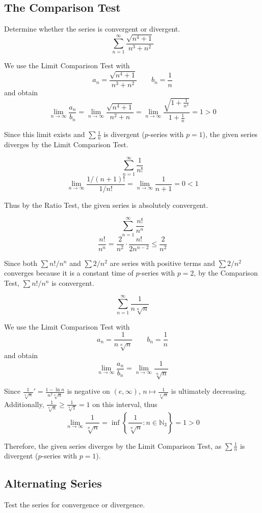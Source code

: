 \documentclass[a4paper,12pt]{article}
\begin{document}
\subsection{The Comparison Test}
Determine whether the series is convergent or divergent.
\[\sum_{n=1}^\infty\frac{\sqrt{n^4 + 1}}{n^3 + n^2}\tag{25}\]

We use the Limit Comparison Test with
\[a_n = \frac{\sqrt{n^4 + 1}}{n^3 + n^2} \qquad b_n = \frac{1}{n}\]
and obtain
\[\lim_{n\to\infty}\frac{a_n}{b_n}
= \lim_{n\to\infty}\frac{\sqrt{n^4 + 1}}{n^2 + n}
= \lim_{n\to\infty}\frac{\sqrt{1 + \frac{1}{n^4}}}{1 + \frac{1}{n}}
= 1 > 0\]

Since this limit exists and $\sum\frac{1}{n}$ is divergent ($p$-series with
$p = 1$), the given series diverges by the Limit Comparison Test.

\[\sum_{n=1}^\infty\frac{1}{n!}\tag{29}\]
\[\lim_{n\to\infty}\frac{1/(n+1)!}{1/n!}
= \lim_{n\to\infty}\frac{1}{n + 1} = 0 < 1\]

Thus by the Ratio Test, the given series is absolutely convergent.

\[\sum_{n=1}^\infty\frac{n!}{n^n}\tag{30}\]
\[\frac{n!}{n^n} = \frac{2}{n^2}\cdot\frac{n!}{2n^{n-2}} \leq \frac{2}{n^2}\]

Since both $\sum n!/n^n$ and $\sum 2/n^2$ are series with positive terms and
$\sum 2/n^2$ converges because it is a constant time of $p$-series with
$p = 2$, by the Comparison Test, $\sum n!/n^n$ is convergent.

\[\sum_{n=1}^\infty\frac{1}{n\sqrt[n]n}\tag{32}\]

We use the Limit Comparison Test with
\[a_n = \frac{1}{n\sqrt[n]n} \qquad b_n = \frac{1}{n}\]
and obtain
\[\lim_{n\to\infty}\frac{a_n}{b_n} = \lim_{n\to\infty}\frac{1}{\sqrt[n]n}\]

Since $\frac{1}{\sqrt[n]n}' = \frac{1 - \ln n}{n^2\sqrt[n]n}$ is negative on
$(e, \infty)$, $n \mapsto \frac{1}{\sqrt[n]n}$ is ultimately decreasing.
Additionally, $\frac{1}{\sqrt[n]n} \geq \frac{1}{\sqrt[n]1} = 1$ on this
interval, thus
\[\lim_{n\to\infty}\frac{1}{\sqrt[n]n}
= \inf\left\{\frac{1}{\sqrt[n]n}: n \in \mathbb N_3\right\} = 1 > 0\]

Therefore, the given series diverges by the Limit Comparison Test,
as $\sum\frac{1}{n}$ is divergent ($p$-series with $p = 1$).

\subsection{Alternating Series}
Test the series for convergence or divergence.
\end{document}
